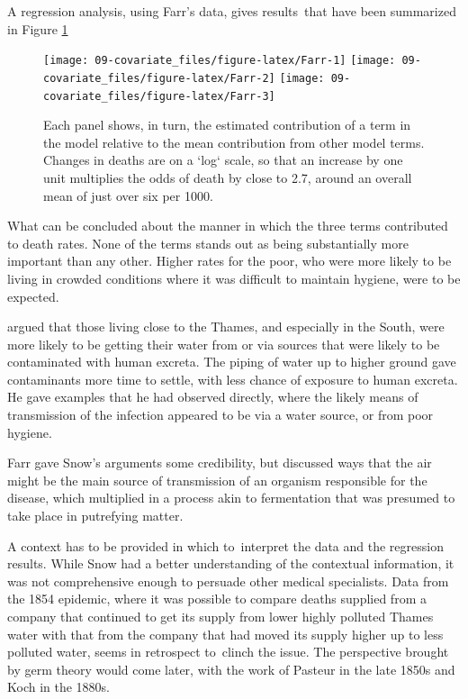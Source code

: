 \documentclass[
  10pt,
  b5paper]{book}
\begin{document}
A regression analysis, using Farr's data, gives
results~that have been summarized in Figure \ref{fig:Farr}

\begin{figure}
\texttt{[image: 09-covariate\_files/figure-latex/Farr-1]} \texttt{[image: 09-covariate\_files/figure-latex/Farr-2]} \texttt{[image: 09-covariate\_files/figure-latex/Farr-3]} \caption{Each panel shows, in turn, the estimated contribution
of a term in the model relative to the mean contribution from other 
model terms. Changes in deaths are on a `log` scale, so that an 
increase by one unit multiplies the odds of death by close to 2.7, 
around an overall mean of just over six per 1000.
}\label{fig:Farr}
\end{figure}

What can be concluded about the manner in which the three terms
contributed to death rates. None of the terms stands out as
being substantially more important than any other. Higher rates
for the poor, who were more likely to be living in crowded
conditions where it was difficult to maintain hygiene, were to
be expected.

\citet{snow1849mode} argued that those living
close to the Thames, and especially in the South, were
more likely to be getting their water from or via sources
that were likely to be contaminated with human excreta. The
piping of water up to higher ground gave contaminants
more time to settle, with less chance of exposure to human
excreta. He gave examples that he had observed directly,
where the likely means of transmission of the infection
appeared to be via a water source, or from poor hygiene.

Farr gave Snow's arguments some credibility, but discussed
ways that the air might be the main source of transmission
of an organism responsible for the disease, which multiplied
in a process akin to fermentation that was presumed to take
place in putrefying matter.

A context has to be provided in which to~interpret the data
and the regression results. While Snow had a better understanding
of the contextual information, it was not comprehensive
enough to persuade other medical specialists. Data from the
1854 epidemic, where it was possible to compare deaths supplied
from a company that continued to get its supply from lower
highly polluted Thames water with that from the company that
had moved its supply higher up to less polluted water, seems
in retrospect to~clinch the issue. The perspective brought by
germ theory would come later, with the work of Pasteur in the
late 1850s and Koch in the 1880s.
\end{document}
